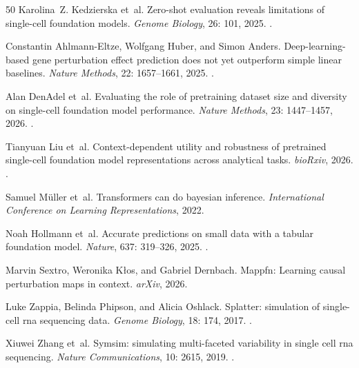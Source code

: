 \documentclass[12pt]{article}
\begin{document}
\begin{thebibliography}{50}
Karolina~Z. Kedzierska et~al.
\newblock Zero-shot evaluation reveals limitations of single-cell foundation
  models.
\newblock \emph{Genome Biology}, 26: 101, 2025.
\newblock {}.

Constantin Ahlmann-Eltze, Wolfgang Huber, and Simon Anders.
\newblock Deep-learning-based gene perturbation effect prediction does not yet
  outperform simple linear baselines.
\newblock \emph{Nature Methods}, 22: 1657--1661, 2025.
\newblock {}.

Alan DenAdel et~al.
\newblock Evaluating the role of pretraining dataset size and diversity on
  single-cell foundation model performance.
\newblock \emph{Nature Methods}, 23: 1447--1457, 2026.
\newblock {}.

Tianyuan Liu et~al.
\newblock Context-dependent utility and robustness of pretrained single-cell
  foundation model representations across analytical tasks.
\newblock \emph{bioRxiv}, 2026.
\newblock {}.

Samuel M{\"u}ller et~al.
\newblock Transformers can do bayesian inference.
\newblock \emph{International Conference on Learning Representations}, 2022.

Noah Hollmann et~al.
\newblock Accurate predictions on small data with a tabular foundation model.
\newblock \emph{Nature}, 637: 319--326, 2025{}.
\newblock {}.

Marvin Sextro, Weronika K{\l}os, and Gabriel Dernbach.
\newblock Mappfn: Learning causal perturbation maps in context.
\newblock \emph{arXiv}, 2026.

Luke Zappia, Belinda Phipson, and Alicia Oshlack.
\newblock Splatter: simulation of single-cell rna sequencing data.
\newblock \emph{Genome Biology}, 18: 174, 2017.
\newblock {}.

Xiuwei Zhang et~al.
\newblock Symsim: simulating multi-faceted variability in single cell rna
  sequencing.
\newblock \emph{Nature Communications}, 10: 2615, 2019.
\newblock {}.


\end{thebibliography}
\end{document}
